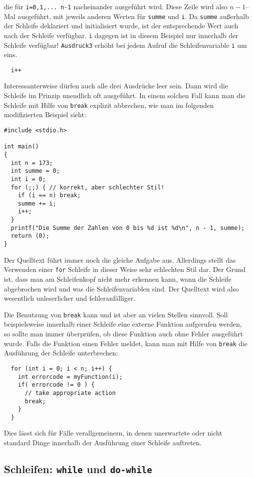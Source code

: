 die für \verb|i=0,1,... n-1| nacheinander ausgeführt wird.
Diese Zeile wird also $n-1$--Mal ausgeführt, mit jeweils anderen Werten für \verb|summe| und \verb|i|.
Da \verb|summe| außerhalb der Schleife deklariert und initialisiert wurde, ist der entsprechende Wert auch nach der Schleife verfügbar.
\verb|i| dagegen ist in diesem Beispiel nur innerhalb der Schleife verfügbar!
\texttt{Ausdruck3} erhöht bei jedem Aufruf die Schleifenvariable \verb|i| um eins.
\begin{lstlisting}
  i++
\end{lstlisting}
Interessanterweise dürfen auch alle drei Ausdrücke leer sein.
Dann wird die Schleife im Prinzip unendlich oft ausgeführt.
In einem solchen Fall kann man die Schleife mit Hilfe von \verb|break| explizit abbrechen, wie man im folgenden modifizierten Beispiel sieht:
\begin{lstlisting}
#include <stdio.h>

int main()
{
  int n = 173;
  int summe = 0;
  int i = 0;
  for (;;) { // korrekt, aber schlechter Stil!
    if (i == n) break;
    summe += i;
    i++;
  }
  printf("Die Summe der Zahlen von 0 bis %d ist %d\n", n - 1, summe);
  return (0);
}
\end{lstlisting}
Der Quelltext führt immer noch die gleiche Aufgabe aus. 
Allerdings stellt das Verwenden einer \texttt{for} Schleife in dieser Weise sehr schlechten Stil dar.
Der Grund ist, dass man am Schleifenkopf nicht mehr erkennen kann, wann die Schleife abgebrochen wird und was die Schleifenvariablen sind.
Der Quelltext wird also wesentlich unleserlicher und fehleranfälliger.

Die Benutzung von \verb|break| kann und ist aber an vielen Stellen sinnvoll.
Soll beispielsweise innerhalb einer Schleife eine externe Funktion aufgerufen werden, so sollte man immer überprüfen, ob diese Funktion auch ohne Fehler ausgeführt wurde.
Falls die Funktion einen Fehler meldet, kann man mit Hilfe von \verb|break| die Ausführung der Schleife unterbrechen:
\begin{lstlisting}
  for (int i = 0; i < n; i++) {
    int errorcode = myFunction(i);
    if( errorcode != 0 ) {
      // take appropriate action
      break;
    }
  }
\end{lstlisting}
Dies lässt sich für Fälle verallgemeinern, in denen unerwartete oder nicht standard Dinge innerhalb der Ausführung einer Schleife auftreten.

\subsection{Schleifen: \texttt{while} und \texttt{do-while}}

